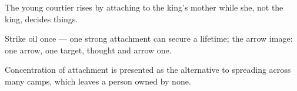 

\begin{distilled}
  \item The young courtier rises by attaching to the king's mother while she, not the king, decides things.
  \item Strike oil once --- one strong attachment can secure a lifetime; the arrow image: one arrow, one target, thought and arrow one.
  \item Concentration of attachment is presented as the alternative to spreading across many camps, which leaves a person owned by none.
\end{distilled}
